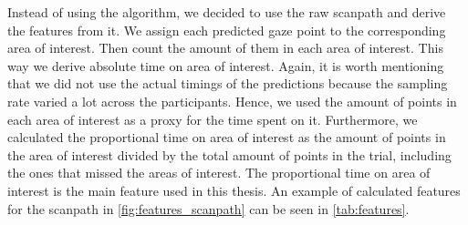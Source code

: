 \begin{figure}
    \centering
    \begin{floatrow}
    \end{floatrow}
\end{figure}

Instead of using the algorithm, we decided to use the raw scanpath and derive the features from it. We assign each predicted gaze point to the corresponding area of interest. Then count the amount of them in each area of interest. This way we derive absolute time on area of interest. Again, it is worth mentioning that we did not use the actual timings of the predictions because the sampling rate varied a lot across the participants. Hence, we used the amount of points in each area of interest as a proxy for the time spent on it. Furthermore, we calculated the proportional time on area of interest as the amount of points in the area of interest divided by the total amount of points in the trial, including the ones that missed the areas of interest. The proportional time on area of interest is the main feature used in this thesis. An example of calculated features for the scanpath in \autoref{fig:features_scanpath} can be seen in \autoref{tab:features}.



